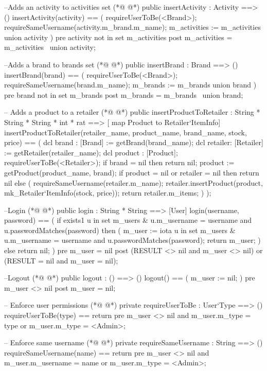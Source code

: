 \begin{vdmpp}[breaklines=true]
 --Adds an activity to activities set
(*@
\label{insertActivity:244}
@*)
 public insertActivity : Activity ==> ()
 insertActivity(activity) ==
 (
  requireUserToBe(<Brand>);
  requireSameUsername(activity.m_brand.m_name);
  m_activities := m_activities union {activity}
 )
 pre activity not in set m_activities
 post m_activities = m_activities~ union {activity};
 
 --Adds a brand to brands set
(*@
\label{insertBrand:255}
@*)
 public insertBrand : Brand ==> ()
 insertBrand(brand) ==
 (
  requireUserToBe(<Brand>);
  requireSameUsername(brand.m_name);
  m_brands := m_brands union {brand}
 )
 pre brand not in set m_brands
 post m_brands = m_brands~ union {brand};
 
 -- Adds a product to a retailer
(*@
\label{insertProductToRetailer:266}
@*)
 public insertProductToRetailer : String * String * String * int * rat ==> [ map Product to Retailer`ItemInfo]
 insertProductToRetailer(retailer_name, product_name, brand_name, stock, price) == 
 ( 
  dcl brand : [Brand] := getBrand(brand_name);
  dcl retailer: [Retailer] := getRetailer(retailer_name);
  dcl product : [Product];
  requireUserToBe(<Retailer>);
  if brand = nil then return nil;
  product := getProduct(product_name, brand);
  if product = nil or retailer = nil then return nil
  else (
   requireSameUsername(retailer.m_name);
   retailer.insertProduct(product, mk_Retailer`ItemInfo(stock, price));
   return retailer.m_items;
  )
 );
 
 --Login
(*@
\label{login:284}
@*)
 public login : String * String ==> [User]
 login(username, password) == 
 (
  if exists1 u in set m_users & u.m_username = username and u.passwordMatches(password)
   then ( 
    m_user := iota u in set m_users & u.m_username = username and u.passwordMatches(password);
    return m_user;
   )
  else return nil;
 )
 pre m_user = nil
 post (RESULT <> nil and m_user <> nil) or (RESULT = nil and m_user = nil);
 
 --Logout
(*@
\label{logout:298}
@*)
 public logout : () ==> ()
 logout() == 
 (
  m_user := nil;
 )
 pre m_user <> nil
 post m_user = nil;
 
 -- Enforce user permissions
(*@
\label{requireUserToBe:307}
@*)
 private requireUserToBe : User`Type ==> ()
 requireUserToBe(type) == return
 pre m_user <> nil and m_user.m_type = type or m_user.m_type = <Admin>;
 
 -- Enforce same username
(*@
\label{requireSameUsername:312}
@*)
 private requireSameUsername : String ==> ()
 requireSameUsername(name) == return
 pre m_user <> nil and m_user.m_username = name or m_user.m_type = <Admin>;
 

\end{vdmpp}
